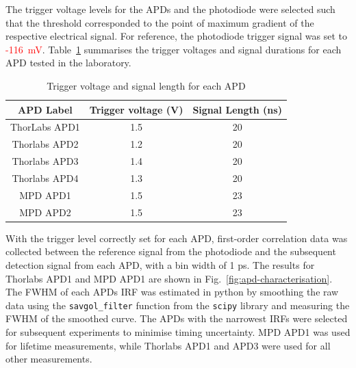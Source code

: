 The trigger voltage levels for the APDs and the photodiode were selected such that the threshold corresponded to the point of maximum gradient of the respective electrical signal. For reference, the photodiode trigger signal was set to \textcolor{red}{-116~mV}. Table~\ref{tab:apd_characterisatoin} summarises the trigger voltages and signal durations for each APD tested in the laboratory.


\begin{table}[h!]
\centering
\begin{tabular}{|c|c|c|}
\hline
\textbf{APD Label} & \textbf{Trigger voltage (V)} & \textbf{Signal Length (ns)} \\
\hline
ThorLabs APD1 &     1.5        &      20        \\
\hline
Thorlabs APD2 &      1.2       &       20       \\
\hline
Thorlabs APD3 &      1.4       &       20       \\
\hline
Thorlabs APD4 &      1.3       &         20     \\
\hline
MPD APD1 &     1.5        &      23        \\
\hline
MPD APD2 &     1.5        &        23      \\
\hline
\end{tabular}
\caption{Trigger voltage and signal length for each APD}
\label{tab:apd_characterisatoin}
\end{table}

With the trigger level correctly set for each APD, first-order correlation data was collected between the reference signal from the photodiode and the subsequent detection signal from each APD, with a bin width of 1 ps. The results for Thorlabs APD1 and MPD APD1 are shown in Fig.~\ref{fig:apd-characterisation}. The FWHM of each APDs IRF was estimated in python by smoothing the raw data using the \texttt{savgol\_filter} function from the \texttt{scipy} library and measuring the FWHM of the smoothed curve. The APDs with the narrowest IRFs were selected for subsequent experiments to minimise timing uncertainty. MPD APD1 was used for lifetime measurements, while Thorlabs APD1 and APD3 were used for all other measurements.


